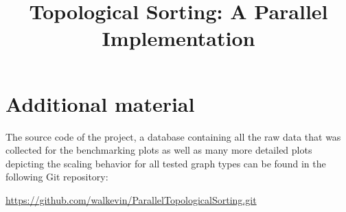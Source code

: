 \documentclass[letterpaper]{article}
\title{Topological Sorting: A Parallel Implementation}
\begin{document}
\maketitle








\section{Additional material}
%
The source code of the project, a database containing all the raw data that was collected for the benchmarking plots as well as many more detailed plots depicting the scaling behavior for all tested graph types can be found in the following Git repository:
\begin{center}
	\href{https://github.com/walkevin/ParallelTopologicalSorting.git}{https://github.com/walkevin/ParallelTopologicalSorting.git}
\end{center}




\end{document}
